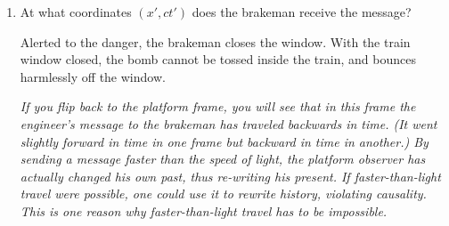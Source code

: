 \begin{enumerate}[wide]
\item At what coordinates $(x', ct')$ does the brakeman receive the message?
\answerspace{0.7in}

Alerted to the danger, the brakeman closes the window. With the train window closed, the bomb cannot be tossed inside the train, and bounces harmlessly off the window. 
\bigskip

\textit{If you flip back to the platform frame, you will see that in this frame the engineer's message to the brakeman has traveled backwards in time.  (It went slightly forward in time in one frame but backward in time in another.)  By sending a message faster than the speed of light, the platform observer has actually changed his own past, thus re-writing his present.  If faster-than-light travel were possible, one could use it to rewrite history, violating causality.  This is one reason why faster-than-light travel has to be impossible.}


\end{enumerate}
